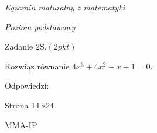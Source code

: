 \documentclass[a4paper,12pt]{article}
\begin{document}
{\it Egzamin maturalny z matematyki}

{\it Poziom podstawowy}

Zadanie $2\mathrm{S}. (2pkt)$

Rozwiąz równanie $4x^{3}+4x^{2}-x-1=0.$

Odpowiedzí:

Strona 14 z24

MMA-IP
\end{document}
